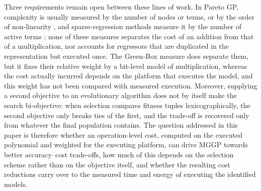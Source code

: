 Three requirements remain open between these lines of work. In Pareto GP, complexity is usually measured by the number
of nodes or terms, or by the order of non-linearity \cite{SK2005,VSH2009}, and sparse-regression methods measure it
by the number of active terms \cite{BPK2016}; none of these measures separates the cost of an addition from that of a
multiplication, nor accounts for regressors that are duplicated in the representation but executed once. The
Green-Box measure does separate them, but it fixes their relative weight by a bit-level model of multiplication, whereas
the cost actually incurred depends on the platform that executes the model, and this weight has not been compared
with measured execution. Moreover, supplying a second objective to an evolutionary algorithm does not by itself make
the search bi-objective: when selection compares fitness tuples lexicographically, the second objective only breaks
ties of the first, and the trade-off is recovered only from whatever the final population contains. The question
addressed in this paper is therefore whether an operation-level cost, computed on the executed polynomial and weighted
for the executing platform, can drive MGGP towards better accuracy--cost trade-offs, how much of this depends on the
selection scheme rather than on the objective itself, and whether the resulting cost reductions carry over to the
measured time and energy of executing the identified models.

